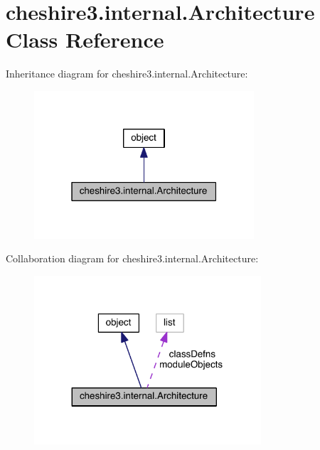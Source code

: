\hypertarget{classcheshire3_1_1internal_1_1_architecture}{\section{cheshire3.\-internal.\-Architecture Class Reference}
\label{classcheshire3_1_1internal_1_1_architecture}
}


Inheritance diagram for cheshire3.\-internal.\-Architecture\-:
\nopagebreak
\begin{figure}[H]
\begin{center}
\leavevmode
\includegraphics[width=232pt]{classcheshire3_1_1internal_1_1_architecture__inherit__graph}
\end{center}
\end{figure}


Collaboration diagram for cheshire3.\-internal.\-Architecture\-:
\nopagebreak
\begin{figure}[H]
\begin{center}
\leavevmode
\includegraphics[width=239pt]{classcheshire3_1_1internal_1_1_architecture__coll__graph}
\end{center}
\end{figure}
